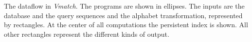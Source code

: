 \documentclass[11pt]{article}
\begin{document}


\noindent The dataflow in \emph{Vmatch}. 
The programs
are shown in ellipses. The inputs are the database
and the query sequences and the alphabet transformation,
represented by rectangles. At the center of all
computations the persistent index is shown. All other
rectangles represent the different kinds of output.

\begin{center}
\centerline{\box\graph}
\end{center}
\end{document}
